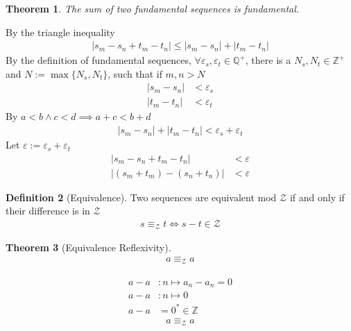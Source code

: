 \documentclass{amsart}
\numberwithin{equation}{section}
\let\oldendproof\endproof
\renewenvironment{proof}[1][\proofname]{%
  \setcounter{case}{0}
  \setcounter{step}{0}
  \oldproof[#1]%
}{\oldendproof}
\theoremstyle{plain}
\newtheorem{theorem}{Theorem}[section]
\theoremstyle{definition}
\newtheorem{definition}[theorem]{Definition}
\theoremstyle{remark}
\begin{document}
\begin{theorem}
  The sum of two fundamental sequences is fundamental.
\end{theorem}
\begin{proof}
  By the triangle inequality
  \begin{align}
    |s_m - s_n + t_m - t_n | \leq |s_m - s_n| + |t_m - t_n|
  \end{align}
  By the definition of fundamental sequences, $\forall \varepsilon_s, \varepsilon_t\in\mathbb{Q}^+$, there is a $N_s, N_t\in\mathbb{Z}^+$ and $N:=\max\{N_s, N_t\}$, such that if $m,n > N$
  \begin{align}
    |s_m - s_n| &< \varepsilon_s\nonumber\\
    |t_m - t_n| &< \varepsilon_t
  \end{align}
  By $a<b\land c<d\implies a+c<b+d$
  \begin{align}
    |s_m - s_n| + |t_m - t_n| < \varepsilon_s + \varepsilon_t
  \end{align}
  Let $\varepsilon:= \varepsilon_s+\varepsilon_t$
  \begin{align}
    |s_m - s_n +t_m - t_n| &< \varepsilon\\
    \left|(s_m + t_m) - (s_n + t_n) \right| &< \varepsilon
  \end{align}
\end{proof}

\begin{definition}[Equivalence]
  Two sequences are equivalent mod $\mathcal{Z}$ if and only if their difference is in $\mathcal{Z}$
  \begin{align}
    s\equiv_\mathcal{Z} t \iff s-t\in\mathcal{Z}
  \end{align}
\end{definition}

\begin{theorem}[Equivalence Reflexivity]
  \begin{align}
    a\equiv_\mathcal{Z} a 
  \end{align}
\end{theorem}
\begin{proof}
  \begin{align}
    a-a&: n \mapsto a_n - a_n = 0\\
    a-a&: n \mapsto 0\\
    a-a &= 0^*\in\mathbb{Z}
  \end{align}
  \begin{align}
    a\equiv_\mathcal{Z} a
  \end{align}
\end{proof}
\end{document}
